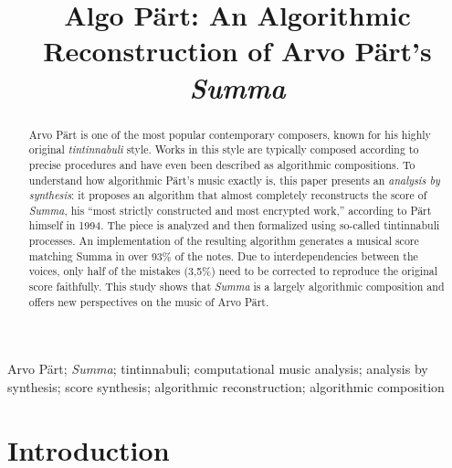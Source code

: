 \documentclass{interact}
\begin{document}
\title{
    Algo Pärt: An Algorithmic Reconstruction of Arvo Pärt's \emph{Summa}}

\author{
}


\maketitle


\begin{abstract}
    Arvo Pärt is one of the most popular contemporary composers, known for his highly original \emph{tintinnabuli} style. 
    Works in this style are typically composed according to precise procedures and have even been described as algorithmic compositions. 
    To understand how algorithmic Pärt’s music exactly is, this paper presents an \emph{analysis by synthesis}: it proposes an algorithm that almost completely reconstructs the score of \emph{Summa}, his “most strictly constructed and most encrypted work,” according to Pärt himself in 1994. 
    The piece is analyzed and then formalized using so-called tintinnabuli processes.
    An implementation of the resulting algorithm generates a musical score matching Summa in over 93\% of the notes. 
    Due to interdependencies between the voices, only half of the mistakes (3,5\%) need to be corrected to reproduce the original score faithfully. 
    This study shows that \emph{Summa} is a largely algorithmic composition and offers new perspectives on the music of Arvo Pärt.
\end{abstract}

\begin{keywords}
Arvo Pärt; \emph{Summa}; tintinnabuli; computational music analysis; analysis by synthesis; score synthesis; algorithmic reconstruction; algorithmic composition
\end{keywords}



\section{Introduction}
\end{document}
